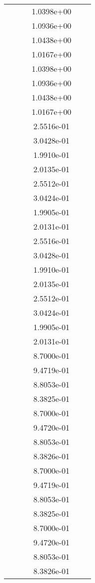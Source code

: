 \begin{xltabular}{\textwidth}{r|rS[table-format=1.3e+2]S[table-format=1.4e+2]S[table-format=1.4e+2]S[table-format=-1.5]}
&  &  & 1.0398e+00 & & \\
&  &  & 1.0936e+00 & & \\
&  &  & 1.0438e+00 & & \\
&  &  & 1.0167e+00 & & \\
&  &  & 1.0398e+00 & & \\
&  &  & 1.0936e+00 & & \\
&  &  & 1.0438e+00 & & \\
&  &  & 1.0167e+00 & & \\
&  &  & 2.5516e-01 & & \\
&  &  & 3.0428e-01 & & \\
&  &  & 1.9910e-01 & & \\
&  &  & 2.0135e-01 & & \\
&  &  & 2.5512e-01 & & \\
&  &  & 3.0424e-01 & & \\
&  &  & 1.9905e-01 & & \\
&  &  & 2.0131e-01 & & \\
&  &  & 2.5516e-01 & & \\
&  &  & 3.0428e-01 & & \\
&  &  & 1.9910e-01 & & \\
&  &  & 2.0135e-01 & & \\
&  &  & 2.5512e-01 & & \\
&  &  & 3.0424e-01 & & \\
&  &  & 1.9905e-01 & & \\
&  &  & 2.0131e-01 & & \\
&  &  & 8.7000e-01 & & \\
&  &  & 9.4719e-01 & & \\
&  &  & 8.8053e-01 & & \\
&  &  & 8.3825e-01 & & \\
&  &  & 8.7000e-01 & & \\
&  &  & 9.4720e-01 & & \\
&  &  & 8.8053e-01 & & \\
&  &  & 8.3826e-01 & & \\
&  &  & 8.7000e-01 & & \\
&  &  & 9.4719e-01 & & \\
&  &  & 8.8053e-01 & & \\
&  &  & 8.3825e-01 & & \\
&  &  & 8.7000e-01 & & \\
&  &  & 9.4720e-01 & & \\
&  &  & 8.8053e-01 & & \\
&  &  & 8.3826e-01 & & \\

\end{xltabular}
